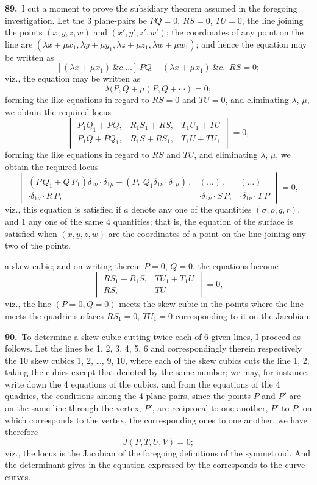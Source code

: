 \documentclass[11pt,a4paper]{article}
\begin{document}
\medskip

\textbf{89.}\ I cut a moment to prove the subsidiary theorem assumed in the foregoing investigation. Let the 3 plane-pairs be $PQ = 0$, $RS = 0$, $TU = 0$, the line joining the points $(x, y, z, w)$ and $(x', y', z', w')$; the coordinates of any point on the line are $(\lambda x + \mu x_1, \lambda y + \mu y_1, \lambda z + \mu z_1, \lambda w + \mu w_1)$; and hence the equation may be written as
\[
[(\lambda x + \mu x_1)\,\&c.\ldots]\, PQ + (\lambda x + \mu x_1)\,\&c.\,\,\,RS = 0;
\]
viz., the equation may be written as
\[
\lambda(P, Q + \mu(P, Q + \cdots) = 0;
\]
forming the like equations in regard to $RS = 0$ and $TU = 0$, and eliminating $\lambda$, $\mu$, we obtain the required locus
\[
\begin{vmatrix}
P_1Q_1 + PQ, & R_1S_1 + RS, & T_1U_1 + TU \\
P_1Q + PQ_1, & R_1S + RS_1, & T_1U + TU_1
\end{vmatrix} = 0,
\]
forming the like equations in regard to $RS$ and $TU$, and eliminating $\lambda$, $\mu$, we obtain the required locus
\[
\begin{vmatrix}
(P\,Q_1 + Q\,P_1)\delta_{1\nu} \cdot \delta_{1\mu} + (P,\ Q_1\delta_{1\nu}\cdot\delta_{1\mu})\,, & (\ldots)\,, & (\ldots)\\
\cdot\delta_{1\nu}\cdot R\,P, & \cdot\delta_{1\nu}\cdot S\,P, & \cdot\delta_{1\nu}\cdot T\,P
\end{vmatrix} = 0,
\]
viz., this equation is satisfied if $a$ denote any one of the quantities $(\sigma, \rho, q, r)$, and 1 any one of the same 4 quantities; that is, the equation of the surface is satisfied when $(x, y, z, w)$ are the coordinates of a point on the line joining any two of the points.

\newpage
\setcounter{page}{169}

\noindent a skew cubic; and on writing therein $P = 0$, $Q = 0$, the equations become
\[
\begin{vmatrix}
RS_1 + R_1S, & TU_1 + T_1U\\
RS, & TU
\end{vmatrix} = 0,
\]
viz., the line $(P = 0, Q = 0)$ meets the skew cubic in the points where the line meets the quadric surfaces $RS_1 = 0$, $TU_1 = 0$ corresponding to it on the Jacobian.

\medskip

\textbf{90.}\ To determine a skew cubic cutting twice each of 6 given lines, I proceed as follows. Let the lines be 1, 2, 3, 4, 5, 6 and correspondingly therein respectively the 10 skew cubics 1, 2, \ldots, 9, 10, where each of the skew cubics cuts the line 1, 2, taking the cubics except that denoted by the same number; we may, for instance, write down the 4 equations of the cubics, and from the equations of the 4 quadrics, the conditions among the 4 plane-pairs, since the points $P$ and $P'$ are on the same line through the vertex, $P'$, are reciprocal to one another, $P'$ to $P$, on which corresponds to the vertex, the corresponding ones to one another, we have therefore
\[
J(P, T, U, V) = 0;
\]
viz., the locus is the Jacobian of the foregoing definitions of the symmetroid. And the determinant gives in the equation expressed by the corresponds to the curve curves.
\end{document}
